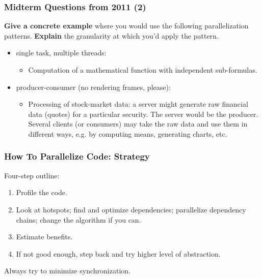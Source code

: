 \begin{frame}
  \frametitle{Midterm Questions from 2011 (2)}


  {\bf Give a concrete example} where you would use the following
  parallelization patterns. {\bf Explain} the granularity at which you'd apply
  the pattern.
  \begin{itemize}
    \item single task, multiple threads:
    \begin{itemize}
      \item<2-> Computation of a mathematical function with independent
        sub-formulas.
    \end{itemize}
    \item producer-consumer (no rendering frames, please):
    \begin{itemize}
      \item<2-> Processing of stock-market data:
        a server might generate raw financial data (quotes) for a
        particular security. The server would be the producer. Several clients
        (or consumers) may take the raw data and use them in different ways, e.g. by computing means, generating charts, etc.
    \end{itemize}
  \end{itemize}
 
\end{frame}


\begin{frame}
  \frametitle{How To Parallelize Code: Strategy}
  
  
  Four-step outline:
  \begin{enumerate}
    \item Profile the code.
    \item Look at hotspots; find and optimize dependencies; parallelize dependency chains; change the algorithm if you can.
    \item Estimate benefits.
    \item If not good enough, step back and try higher level of abstraction.
  \end{enumerate}
  Always try to minimize synchronization.
  

\end{frame}


